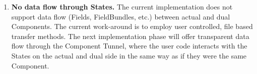 %


\begin{enumerate}

\item {\bf No data flow through States.} The current implementation does not support data flow (Fields, FieldBundles, etc.) between actual and dual Components. The current work-around is to employ user controlled, file based transfer methods. The next implementation phase will offer transparent data flow through the Component Tunnel, where the user code interacts with the States on the actual and dual side in the same way as if they were the same Component.

\end{enumerate}
